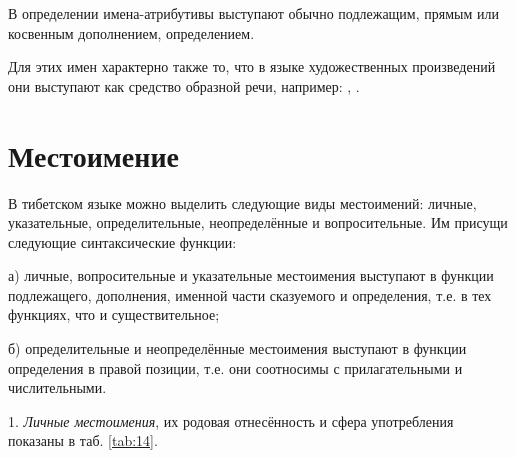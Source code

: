 В определении имена-атрибутивы выступают обычно подлежащим, прямым или косвенным дополнением, определением.

Для этих имен характерно также то, что в языке художественных произведений они выступают как средство образной речи, например:
, .


\section{Местоимение}

В тибетском языке можно выделить следующие виды местоимений: личные, указательные, определительные, неопределённые и вопросительные. Им присущи следующие синтаксические функции:

а) личные, вопросительные и указательные местоимения выступают в функции подлежащего, дополнения, именной части сказуемого и определения, т.е. в тех функциях, что и существительное;

б) определительные и неопределённые местоимения выступают в функции определения в правой позиции, т.е. они соотносимы с прилагательными и числительными.

1. \emph{Личные местоимения}, их родовая отнесённость и сфера употребления показаны в  таб. \ref{tab:14}.

